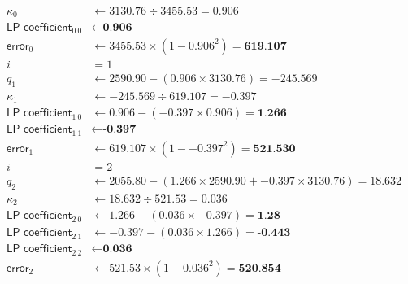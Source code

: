 {
  \begin{align*}
    \kappa_0 &\leftarrow 3130.76 \div 3455.53 = 0.906 \\
    \textsf{LP coefficient}_{0~0} &\leftarrow \textbf{0.906} \\
    \textsf{error}_0 &\leftarrow 3455.53 \times (1 - {0.906} ^ 2) = \textbf{619.107} \\
    i &= 1 \\
    q_1 &\leftarrow 2590.90 - (0.906 \times 3130.76) = -245.569 \\
    \kappa_1 &\leftarrow -245.569 \div 619.107 = -0.397 \\
    \textsf{LP coefficient}_{1~0} &\leftarrow 0.906 - (-0.397 \times 0.906) = \textbf{1.266} \\
    \textsf{LP coefficient}_{1~1} &\leftarrow \textbf{-0.397} \\
    \textsf{error}_1 &\leftarrow 619.107 \times (1 - {-0.397} ^ 2) = \textbf{521.530} \\
    i &= 2 \\
    q_2 &\leftarrow 2055.80 - (1.266 \times 2590.90 + -0.397 \times 3130.76) = 18.632 \\
    \kappa_2 &\leftarrow 18.632 \div 521.53 = 0.036 \\
    \textsf{LP coefficient}_{2~0} &\leftarrow 1.266 - (0.036 \times -0.397) = \textbf{1.28} \\
    \textsf{LP coefficient}_{2~1} &\leftarrow -0.397 - (0.036 \times 1.266) = \textbf{-0.443} \\
    \textsf{LP coefficient}_{2~2} &\leftarrow \textbf{0.036} \\
    \textsf{error}_2 &\leftarrow 521.53 \times (1 - {0.036} ^ 2) = \textbf{520.854} \\
  \end{align*}
}

\clearpage

